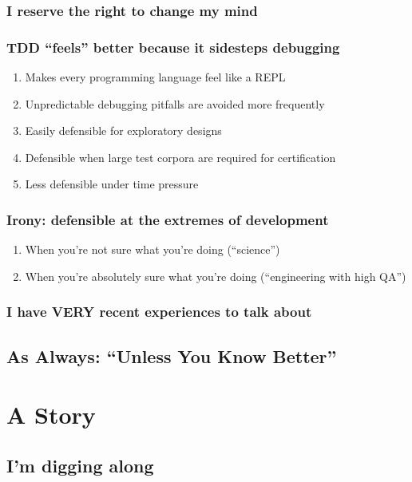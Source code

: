 \documentclass[10pt,oneside,x11names]{article}
\begin{document}
\subsubsection{I reserve the right to change my mind}
\label{sec:org34b18df}
\subsubsection{TDD ``feels'' better because it sidesteps debugging}
\label{sec:orgfb26e81}
\begin{enumerate}
\item Makes every programming language feel like a REPL
\label{sec:orge0a93cd}
\item Unpredictable debugging pitfalls are avoided more frequently
\label{sec:org5bcd0cb}
\item Easily defensible for exploratory designs
\label{sec:org2a47bee}
\item Defensible when large test corpora are required for certification
\label{sec:org436dd95}
\item Less defensible under time pressure
\label{sec:org97f1b75}
\end{enumerate}
\subsubsection{Irony: defensible at the extremes of development}
\label{sec:orgb6e77c1}
\begin{enumerate}
\item When you're not sure what you're doing (``science'')
\label{sec:org9b3bdae}
\item When you're absolutely sure what you're doing (``engineering with high QA'')
\label{sec:org8bded85}
\end{enumerate}
\subsubsection{I have VERY recent experiences to talk about}
\label{sec:orga989fda}
\subsection{As Always: ``Unless You Know Better''}
\label{sec:orga992582}
\section{A Story}
\label{sec:org97bbe2f}
\subsection{I'm digging along}
\label{sec:org0559943}
\end{document}
